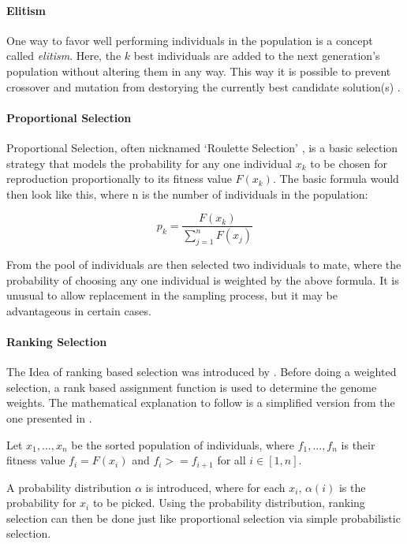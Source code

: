 \documentclass[11pt,a4paper,twoside,openright]{scrbook}
\begin{document}
\paragraph{Elitism}
One way to favor well performing individuals in the population is a concept called \emph{elitism}. Here, the \(k\) best individuals are added to the next generation's population without altering them in any way. This way it is possible to prevent crossover and mutation from destorying the currently best candidate solution(s) \cite{Vasconcelos01}.

\paragraph{Proportional Selection}
Proportional Selection, often nicknamed `Roulette Selection' \cite{DeJong75, Goldberg89}, is a basic selection strategy that models the probability for any one individual \(x_k\) to be chosen for reproduction proportionally to its fitness value \(F(x_k)\). The basic formula would then look like this, where n is the number of individuals in the population:

\begin{equation} \label{eq:propSelection}
p_{k} = \frac{F(x_k)}{\sum_{j=1}^{n} F(x_{j})}
\end{equation}

From the pool of individuals are then selected two individuals to mate, where the probability of choosing any one individual is weighted by the above formula. It is unusual to allow replacement in the sampling process, but it may be advantageous in certain cases.

\paragraph{Ranking Selection}

The Idea of ranking based selection was introduced by \cite{Baker85}.
Before doing a weighted selection, a rank based assignment function is used to determine the genome weights. The mathematical explanation to follow is a simplified version from the one presented in \cite{Goldberg91}.

\medskip
Let \(x_1,...,x_n\) be the sorted population of individuals, where \(f_1,...,f_n\) is their fitness value \(f_i=F(x_i)\) and \(f_i >= f_{i+1}\) for all \(i \in [1,n]\).

A probability distribution \(\alpha\) is introduced, where for each \(x_i\), \(\alpha (i)\) is the probability for \(x_i\) to be picked. Using the probability distribution, ranking selection can then be done just like proportional selection via simple probabilistic selection.
\end{document}
